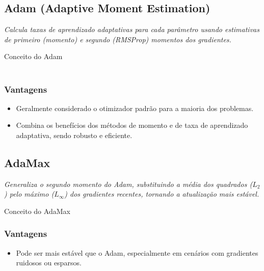 \subsection{Adam (Adaptive Moment Estimation)}

\textit{Calcula taxas de aprendizado adaptativas para cada parâmetro usando estimativas de primeiro (momento) e segundo (RMSProp) momentos dos gradientes.}

\begin{equacaodestaque}{Conceito do Adam}
     \\
     \\
\end{equacaodestaque}

\subsubsection*{Vantagens}
\begin{itemize}
    \item Geralmente considerado o otimizador padrão para a maioria dos problemas.
    \item Combina os benefícios dos métodos de momento e de taxa de aprendizado adaptativa, sendo robusto e eficiente.
\end{itemize}

\subsection{AdaMax}

\textit{Generaliza o segundo momento do Adam, substituindo a média dos quadrados ($L_2$) pelo máximo ($L_\infty$) dos gradientes recentes, tornando a atualização mais estável.}

\begin{equacaodestaque}{Conceito do AdaMax}
     \\
\end{equacaodestaque}

\subsubsection*{Vantagens}
\begin{itemize}
    \item Pode ser mais estável que o Adam, especialmente em cenários com gradientes ruidosos ou esparsos.
\end{itemize}

